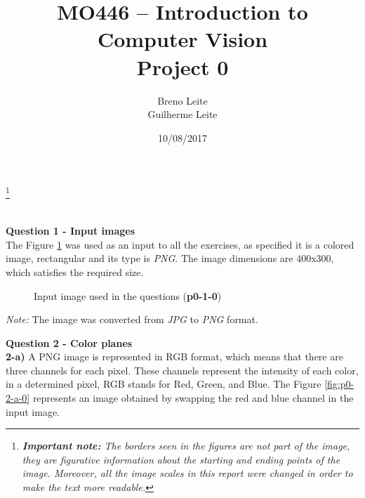 \documentclass[12pt,a4paper]{article}
\title{MO446 -- Introduction to Computer Vision  \\ Project 0}
\author{Breno Leite  \\ Guilherme Leite}
\date{10/08/2017}
\newcommand\blfootnote[1]{%
	\begingroup
	\renewcommand\thefootnote{}\footnote{#1}%
	\addtocounter{footnote}{-1}%
	\endgroup
}
\begin{document}
\maketitle
\blfootnote{\textit{\textbf{Important note:} The borders seen in the figures are not part of the image, they are figurative information about the starting and ending points of the image. Moreover, all the image scales in this report were changed in order to make the text more readable.}} \\


\textbf{Question 1 - Input images} \\

The Figure \ref{fig:p0-1-0} was used as an input to all the exercises, as specified it is a colored image, rectangular and its type is \emph{PNG}. The image dimensions are 400x300, which satisfies the required size. \\

\begin{figure}[!h]
	\centering
	{%
		\setlength{\fboxsep}{1pt}%
		\setlength{\fboxrule}{1pt}%
	}%
	\caption{Input image used in the questions (\textbf{p0-1-0})}
	\label{fig:p0-1-0}
\end{figure}

\textit{Note:} The image was converted from \emph{JPG} to \emph{PNG} format. 

\newpage


\textbf{Question 2 - Color planes} \\

\textbf{2-a) } A PNG image is represented in RGB format, which means that there are three channels for each pixel. These channels represent the intensity of each color, in a determined pixel, RGB stands for Red, Green, and Blue. The Figure \ref{fig:p0-2-a-0} represents an image obtained by swapping the red and blue channel in the input image.
\end{document}
